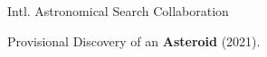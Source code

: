 \entryItem
	{Intl. Astronomical Search Collaboration}
	{}

	\begin{items}
		\item Provisional Discovery of an \textbf{Asteroid} (2021).
	\end{items}
